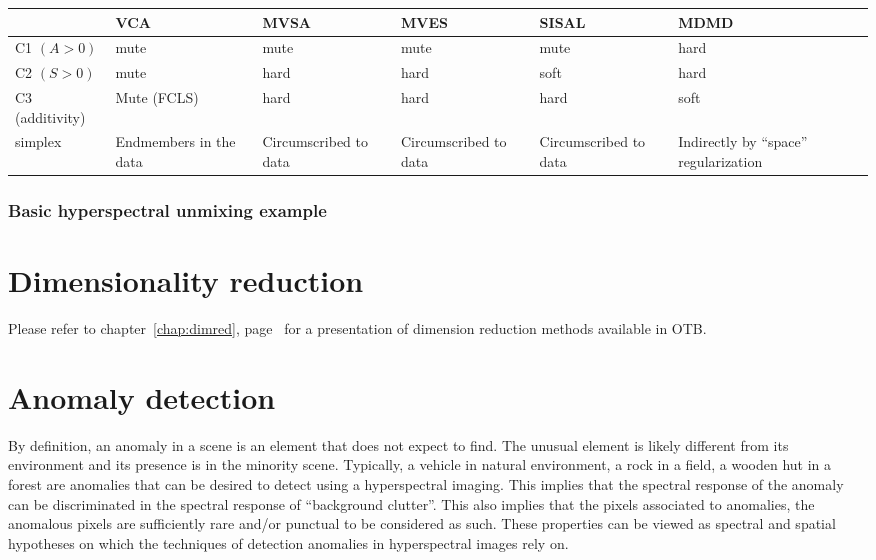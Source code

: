 \begin{center}
   \begin{tabular}{ | p{1.5cm} | | p{2cm} | p{2cm} | p{2cm} | p{2cm} | p{2cm} | }
     \hline
     & VCA & MVSA & MVES & SISAL & MDMD \\ \hline
     C1 $(A>0)$ & mute & mute & mute & mute & hard \\ \hline
     C2 $(S>0)$ & mute & hard & hard & soft & hard \\ \hline
     C3 (additivity) & Mute (FCLS) & hard & hard & hard & soft \\ \hline
     simplex & Endmembers in the data & Circumscribed to data & 
     Circumscribed to data & Circumscribed to data &
     Indirectly by ``space'' regularization \\ \hline
   \end{tabular}
 \end{center}

\subsubsection{Basic hyperspectral unmixing example}


\section{Dimensionality reduction}

Please refer to chapter~\ref{chap:dimred}, page~\pageref{chap:dimred} for a presentation of dimension reduction methods available in OTB.

\section{Anomaly detection}
By definition, an anomaly in a scene is an element that does not
expect to find. The unusual element is likely different from its
environment and its presence is in the minority scene. Typically, a
vehicle in natural environment, a rock in a field, a wooden hut in a
forest are anomalies that can be desired to detect using a
hyperspectral imaging. This implies that the spectral response of the
anomaly can be discriminated in the spectral response of ``background
clutter''. This also implies that the pixels associated to anomalies,
the anomalous pixels are sufficiently rare and/or punctual to be
considered as such. These properties can be viewed as spectral and
spatial hypotheses on which the techniques of detection anomalies in
hyperspectral images rely on.


